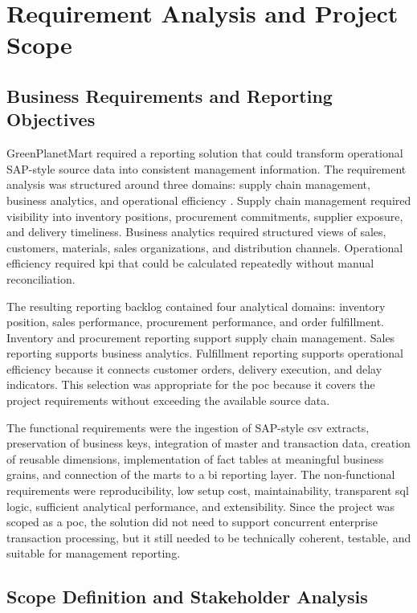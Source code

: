 \section{Requirement Analysis and Project Scope}

\subsection{Business Requirements and Reporting Objectives}

GreenPlanetMart required a reporting solution that could transform operational SAP-style source data into consistent management information. The requirement analysis was structured around three domains: supply chain management, business analytics, and operational efficiency \parencite{sharp_stakeholder_1999}. Supply chain management required visibility into inventory positions, procurement commitments, supplier exposure, and delivery timeliness. Business analytics required structured views of sales, customers, materials, sales organizations, and distribution channels. Operational efficiency required \ac{kpi} that could be calculated repeatedly without manual reconciliation.

The resulting reporting backlog contained four analytical domains: inventory position, sales performance, procurement performance, and order fulfillment. Inventory and procurement reporting support supply chain management. Sales reporting supports business analytics. Fulfillment reporting supports operational efficiency because it connects customer orders, delivery execution, and delay indicators. This selection was appropriate for the \ac{poc} because it covers the project requirements without exceeding the available source data.

The functional requirements were the ingestion of SAP-style \ac{csv} extracts, preservation of business keys, integration of master and transaction data, creation of reusable dimensions, implementation of fact tables at meaningful business grains, and connection of the marts to a \ac{bi} reporting layer. The non-functional requirements were reproducibility, low setup cost, maintainability, transparent \ac{sql} logic, sufficient analytical performance, and extensibility. Since the project was scoped as a \ac{poc}, the solution did not need to support concurrent enterprise transaction processing, but it still needed to be technically coherent, testable, and suitable for management reporting.

\subsection{Scope Definition and Stakeholder Analysis}

